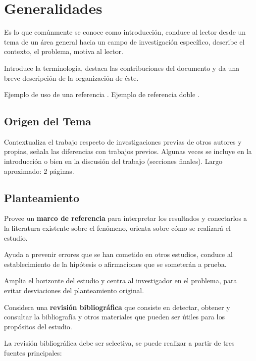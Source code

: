 \documentclass[letter,12pt]{report}
\newcommand\naranjo[1]{\textcolor[rgb]{1.00,0.36,0.06}{\textbf{#1}}}
\begin{document}
\cleardoublepage
{}
\setcounter{page}{1}









\chapter{Generalidades}
Es lo que comúnmente se conoce como introducción, conduce al lector desde un tema de un área general hacia un campo de investigación específico, describe el contexto, el problema, motiva al lector.

Introduce la terminología, destaca las contribuciones del documento y da una breve descripción de la organización de éste.

Ejemplo de uso de una referencia \cite{001}. Ejemplo de referencia doble \cite{001,002}.

\section{Origen del Tema}
Contextualiza el trabajo respecto de investigaciones previas de otros autores y propias, señala las diferencias con trabajos previos. Algunas veces se incluye en la introducción o bien en la discusión del trabajo (secciones finales). Largo aproximado: 2 páginas.
\section{Planteamiento}

Provee un \naranjo{marco de referencia} para interpretar los resultados y conectarlos a la literatura existente sobre el fenómeno, orienta sobre cómo se realizará el estudio.

 Ayuda a prevenir errores que se han cometido en otros estudios, conduce al establecimiento de la hipótesis o afirmaciones que se someterán a prueba.
 
 Amplia el horizonte del estudio y centra al investigador en el problema, para evitar desviaciones del planteamiento original.

Considera una \naranjo{revisión bibliográfica} que consiste en detectar, obtener y consultar la bibliografía y otros materiales que pueden ser útiles para los propósitos del estudio.

La revisión bibliográfica debe ser selectiva, se puede realizar a partir de tres fuentes principales:
\end{document}
